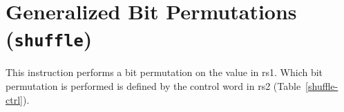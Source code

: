 

%
%
%
%
%
%
%
%
%


\section{Generalized Bit Permutations (\texttt{shuffle})}

This instruction performs a bit permutation on the value in rs1. Which bit permutation
is performed is defined by the control word in rs2 (Table~\ref{shuffle-ctrl}).

